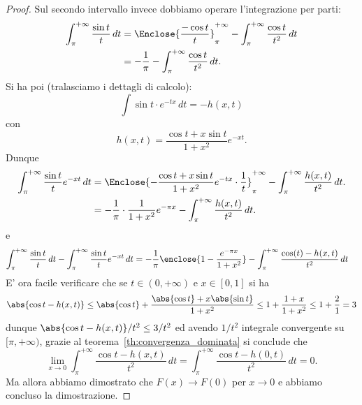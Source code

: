 \begin{proof}
Sul secondo intervallo invece dobbiamo operare l'integrazione per parti:
\begin{align*}
  \int_\pi^{+\infty} \frac{\sin t}{t}\, dt 
  &= \Enclose{\frac{-\cos t}{t}}_{\pi}^{+\infty}
    - \int_{\pi}^{+\infty} \frac{\cos t}{t^2}\, dt \\
  &= -\frac{1}{\pi} - \int_{\pi}^{+\infty} \frac {\cos t}{t^2}\, dt.\\
\end{align*}
Si ha poi (tralasciamo i dettagli di calcolo):
\[
\int \sin t\cdot e^{-tx}\, dt 
= -h(x,t)
\]
con 
\[
h(x,t)= \frac{\cos t+x\sin t}{1+x^2}e^{-xt}.  
\]
Dunque 
\begin{align*}
  \int_\pi^{+\infty} \frac{\sin t}{t} e^{-xt}\, dt 
  &= \Enclose{-\frac{\cos t+ x \sin t}{1+x^2}e^{-tx}\cdot \frac{1}{t}}_{\pi}^{+\infty} 
  - \int_\pi^{+\infty}\frac{h(x,t)}{t^2}\, dt.\\  
  &= -\frac 1 \pi\cdot \frac{1}{1+x^2}e^{-\pi x} - \int_\pi^{+\infty}\frac{h(x,t)}{t^2}\, dt.
\end{align*}
e
\begin{align*}
\int_\pi^{+\infty} \frac{\sin t}{t}\, dt 
-\int_\pi^{+\infty} \frac{\sin t}{t} e^{-xt}\, dt
&= -\frac 1 \pi \enclose{1-\frac{e^{-\pi x}}{1+x^2}}
-\int_\pi^{+\infty} \frac{\cos(t) - h(x,t)}{t^2}\, dt 
\end{align*}
E' ora facile verificare che se $t\in(0,+\infty)$
e $x\in[0,1]$ si ha 
\[
\abs{\cos t - h(x,t)} \le \abs{\cos t} + \frac{\abs{\cos t}+x\abs{\sin t}}{1+x^2}
\le 1+ \frac{1+x}{1+x^2} \le 1 + \frac 2 1 = 3
\]
dunque $\abs{\cos t - h(x,t)}/t^2 \le 3/t^2$ ed avendo $1/t^2$ 
integrale convergente su $[\pi,+\infty)$, grazie 
al teorema~\ref{th:convergenza_dominata} si conclude 
che 
\[
\lim_{x\to 0} \int_\pi^{+\infty} \frac{\cos t - h(x,t)}{t^2}\, dt 
= \int_{\pi}^{+\infty} \frac{\cos t - h(0,t)}{t^2}\, dt 
= 0.  
\]
Ma allora abbiamo dimostrato che $F(x)\to F(0)$ per $x\to 0$ 
e abbiamo concluso la dimostrazione.
\end{proof}

